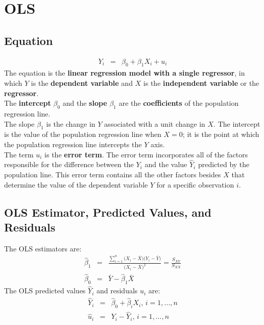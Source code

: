 \chapter{OLS}

\section{Equation}
\begin{eqnarray}
	Y_{i} &=& \beta_{0} + \beta_{1} X_{i} + u_{i}
\end{eqnarray}
The equation is the \textbf{\color{blue}linear regression model with a single regressor}, in which $Y$ is the \textbf{\color{blue}dependent variable} and $X$ is the \textbf{\color{blue}independent variable} or the \textbf{\color{blue}regressor}.\\
The \textbf{\color{blue}intercept} $\beta_{0}$ and the \textbf{\color{blue}slope} $\beta_{1}$ are the \textbf{\color{blue}coefficients} of the population regression line.\\
The slope $\beta_{1}$ is the change in $Y$ associated with a unit change in $X$. The intercept is the value of the population regression line when $X = 0$; it is the point at which the population regression line intercepts the $Y$ axis.\\
The term $u_{i}$ is the \textbf{\color{blue}error term}. The error term incorporates all of the factors responsible for the difference between the $Y_{i}$ and the value $\hat{Y}_{i}$ predicted by the population line. This error term contains all the other factors besides $X$ that determine the value of the dependent variable $Y$ for a specific observation $i$.

\section{OLS Estimator, Predicted Values, and Residuals}
The OLS estimators are:
\begin{eqnarray}
	\hat{\beta}_{1} &=& \frac{\sum_{i = 1}^{n}\big(X_{i} - \bar{X}\big)\big(Y_{i} - \bar{Y}\big)}{\big(X_{i} - \bar{X}\big)^{2}} = \frac{S_{XY}}{S_{XX}}\\
	\hat{\beta}_{0} &=& \bar{Y} - \hat{\beta}_{1}\bar{X}
\end{eqnarray}
The OLS predicted values $\hat{Y}_{i}$ and residuals $\hat{u}_{i}$ are:
\begin{eqnarray}
	\hat{Y}_{i} &=& \hat{\beta}_{0} + \hat{\beta}_{i}X_{i}\text{, $i = 1, ..., n$}\\
	\hat{u}_{i} &=& Y_{i} - \hat{Y}_{i}\text{, $i = 1, ..., n$}
\end{eqnarray}

